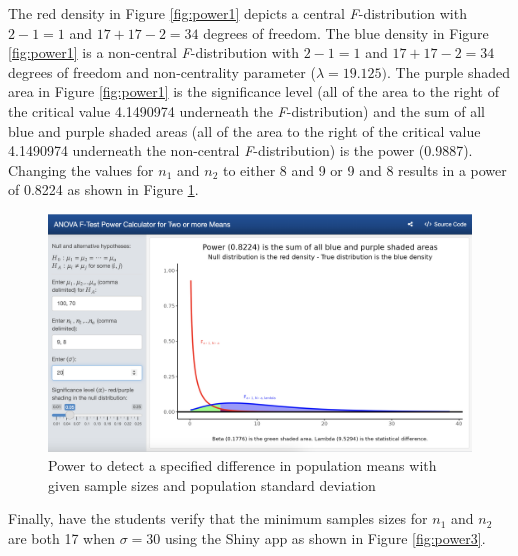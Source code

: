 \documentclass[
]{article}
\begin{document}
The red density in Figure \ref{fig:power1} depicts a central \emph{F}-distribution with \(2 - 1 = 1\) and \(17 + 17 - 2 = 34\) degrees of freedom. The blue density in Figure \ref{fig:power1} is a non-central \emph{F}-distribution with \(2-1 = 1\) and \(17 + 17 - 2 = 34\) degrees of freedom and non-centrality parameter (\(\lambda = 19.125)\). The purple shaded area in Figure \ref{fig:power1} is the significance level (all of the area to the right of the critical value 4.1490974 underneath the \emph{F}-distribution) and the sum of all blue and purple shaded areas (all of the area to the right of the critical value 4.1490974 underneath the non-central \emph{F}-distribution) is the power (0.9887). Changing the values for \(n_1\) and \(n_2\) to either 8 and 9 or 9 and 8 results in a power of 0.8224 as shown in Figure \ref{fig:power2}.

\begin{figure}

{\centering \includegraphics[width=5.93in]{fig-power2a} 

}

\caption{Power to detect a specified difference in population means with given sample sizes and population standard deviation}\label{fig:power2}
\end{figure}

Finally, have the students verify that the minimum samples sizes for \(n_1\) and \(n_2\) are both 17 when \(\sigma = 30\) using the Shiny app as shown in Figure \ref{fig:power3}.
\end{document}
